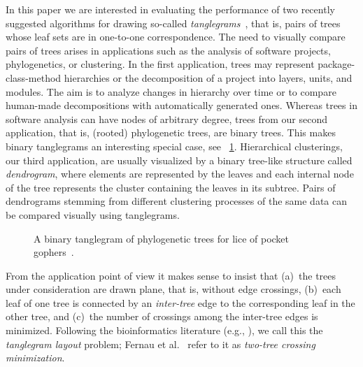 \documentclass[runningheads,a4paper]{llncs}
\begin{document}
In this paper we are interested in evaluating the performance of two
recently suggested algorithms for drawing so-called
\emph{tanglegrams}~\cite{p-ttpcc-02}, that is, pairs of trees whose
leaf sets are in one-to-one correspondence.  The need to visually
compare pairs of trees arises in applications such as the analysis
of software projects, phylogenetics, or clustering.  In the first
application, trees may represent package-class-method hierarchies or
the decomposition of a project into layers, units, and modules.  The
aim is to analyze changes in hierarchy over time or to compare
human-made decompositions with automatically generated ones. Whereas
trees in software analysis can have nodes of arbitrary degree, trees
from our second application, that is, (rooted) phylogenetic trees,
are binary trees. This makes binary tanglegrams an interesting
special case, see \figurename~\ref{fig:example}. Hierarchical
clusterings, our third application, are usually visualized by a
binary tree-like structure called \emph{dendrogram}, where elements
are represented by the leaves and each internal node of the tree
represents the cluster containing the leaves in its subtree. Pairs
of dendrograms stemming from different clustering processes of the
same data can be compared visually using tanglegrams.



\begin{figure}[tb]
  \hfill
  \caption{A binary tanglegram of phylogenetic
    trees for lice of pocket gophers~\cite{hsvsdn-drmec-94}.}
  \label{fig:example}
  \vspace{-2ex}
\end{figure}

From the application
point of view it makes sense to insist that (a)~the trees under
consideration are drawn plane, that is, without edge crossings,
(b)~each leaf of one tree is connected by an \emph{inter-tree} edge to
the corresponding leaf in the other tree, and (c)~the number of
crossings among the inter-tree edges is minimized.  Following the
bioinformatics literature (e.g., \cite{p-ttpcc-02,lprvz-stapt-07}), we
call this the \emph{tanglegram layout} problem; Fernau et
al.~\cite{fkp-ctvcm-05} refer to it as \emph{two-tree crossing
  minimization}.\smallskip
\end{document}

